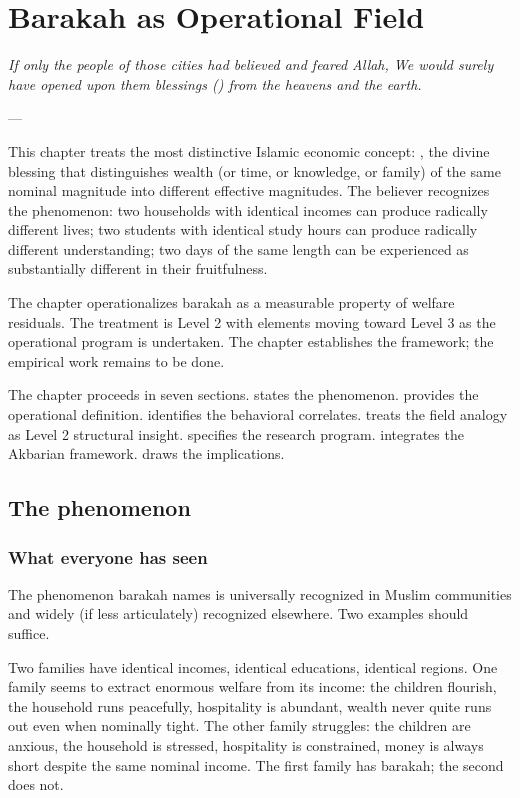 \chapter{Barakah as Operational Field}
\label{ch:barakah}

\epigraph{\itshape If only the people of those cities had believed
and feared Allah, We would surely have opened upon them blessings
() from the heavens and the earth.}{--- }

\noindent
This chapter treats the most distinctive Islamic economic concept:
, the divine blessing that distinguishes wealth (or
time, or knowledge, or family) of the same nominal magnitude into
different effective magnitudes. The believer recognizes the
phenomenon: two households with identical incomes can produce
radically different lives; two students with identical study
hours can produce radically different understanding; two days of
the same length can be experienced as substantially different in
their fruitfulness.

The chapter operationalizes barakah as a measurable property of
welfare residuals. The treatment is Level 2 with elements moving
toward Level 3 as the operational program is undertaken. The
chapter establishes the framework; the empirical work remains
to be done.

The chapter proceeds in seven sections.  states
the phenomenon.  provides the
operational definition.  identifies the
behavioral correlates.  treats the
field analogy as Level 2 structural insight. 
specifies the research program.  integrates
the Akbarian framework.  draws the
implications.

\section{The phenomenon}
\label{sec:bar-claim}

\subsection{What everyone has seen}

The phenomenon barakah names is universally recognized in Muslim
communities and widely (if less articulately) recognized
elsewhere. Two examples should suffice.

Two families have identical incomes, identical educations,
identical regions. One family seems to extract enormous welfare
from its income: the children flourish, the household runs
peacefully, hospitality is abundant, wealth never quite runs out
even when nominally tight. The other family struggles: the
children are anxious, the household is stressed, hospitality is
constrained, money is always short despite the same nominal
income. The first family has barakah; the second does not.

